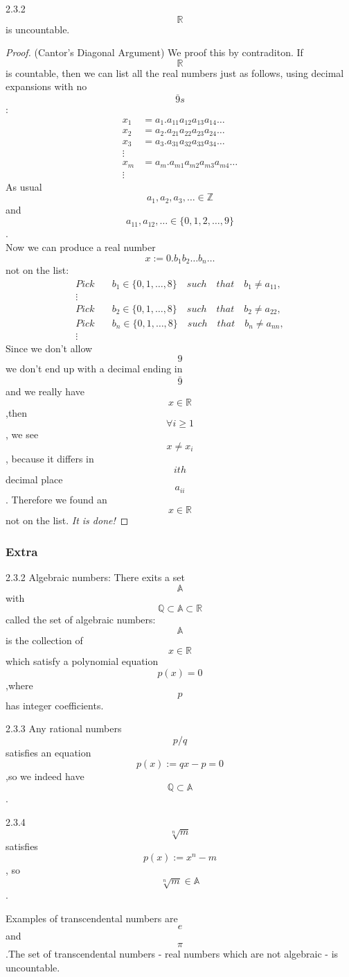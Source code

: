 \documentclass[a4paper]{article}
\def\rr{{\mathbb R}}
\begin{document}
\begin{theorem}{2.3.2}{}
    $$\rr$$ is uncountable.
\end{theorem}
\begin{proof}(Cantor's Diagonal Argument) We proof this by contraditon. If $$\mathbb{R}$$ is countable, then we can list all the real numbers just as follows, using decimal expansions with no $$\overline{9}s$$:
\begin{align*}
    x_1&=a_1.a_{11}a_{12}a_{13}a_{14}\ldots\\
    x_2&=a_2.a_{21}a_{22}a_{23}a_{24}\ldots\\
    x_3&=a_3.a_{31}a_{32}a_{33}a_{34}\ldots\\
    \vdots \\
    x_m&=a_m.a_{m1}a_{m2}a_{m3}a_{m4}\ldots\\
    \vdots
\end{align*}
As usual $$a_1,a_2,a_3,\ldots\in \mathbb{Z}$$ and $$a_{11},a_{12},\ldots\in \{0,1,2,\ldots,9\}$$.\\
Now we can produce a real number $$x:=0.b_1b_2\ldots b_n\ldots$$ not on the list:
\begin{align*}
    Pick& \quad b_1\in \{0,1,\ldots,8\}\quad such \quad that \quad b_1 \neq a_{11},\\
    \vdots\\
    Pick& \quad b_2\in \{0,1,\ldots,8\}\quad such \quad that \quad  b_2 \neq a_{22},\\
    Pick& \quad b_n\in \{0,1,\ldots,8\}\quad such \quad that \quad  b_n \neq a_{nn},\\
    \vdots
\end{align*}
Since we don't allow $$9$$ we don't end up with a decimal ending in $$\bar{9}$$ and we really have $$x\in\mathbb{R}$$,then $$\forall i\geq 1$$, we see $$x \neq x_i$$, because it differs in $$ith$$ decimal place $$a_{ii}$$.
Therefore we found an $$x\in \mathbb{R}$$ not on the list. \textit{It is done!}
\end{proof}
\subsubsection{Extra}
    \begin{definition}{2.3.2}{}
        Algebraic numbers: There exits a set $$\mathbb{A}$$ with $$\mathbb{Q}\subset \mathbb{A}\subset \mathbb{R}$$ called the set of algebraic numbers: $$\mathbb{A}$$ is the collection of $$x\in \mathbb{R}$$ which satisfy a polynomial equation $$p(x)=0$$,where $$p$$ has integer coefficients.
    \end{definition}
    \begin{proposition}{2.3.3}{}
        Any rational numbers $$p/q$$ satisfies an equation $$p(x):=qx-p=0$$,so we indeed have $$\mathbb{Q}\subset\mathbb{A}$$. 
         \end{proposition}
    \begin{proposition}{2.3.4}{}
           $$\sqrt[n]{m}$$ satisfies $$p(x):=x^n-m$$, so $$\sqrt[n]{m}\in \mathbb{A}$$.
    \end{proposition}
    Examples of transcendental numbers are $$e$$ and $$\pi$$ .The set of transcendental numbers - real numbers which are not algebraic - is uncountable.
\end{document}

